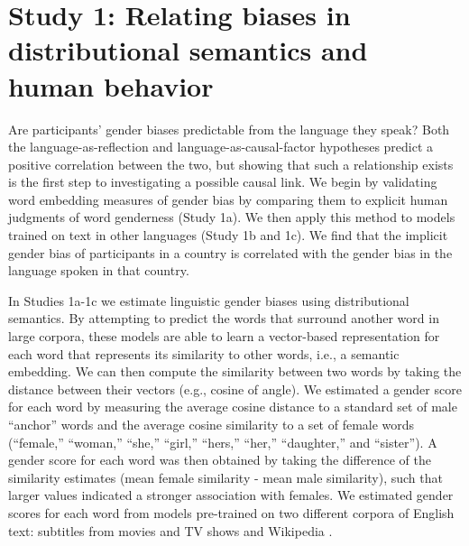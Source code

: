 \documentclass[9pt,twocolumn,twoside,lineno]{pnas-new}
\begin{document}
\section*{Study 1: Relating biases in distributional semantics and
human
behavior}\label{study-1-relating-gender-biases-in-distributional-semantics-and-human-behavior}

Are participants' gender biases predictable from the language they
speak? Both the language-as-reflection and language-as-causal-factor
hypotheses predict a positive correlation between the two, but showing
that such a relationship exists is the first step to investigating a
possible causal link. We begin by validating word embedding measures of
gender bias by comparing them to explicit human judgments of word
genderness (Study 1a). We then apply this method to models trained on
text in other languages (Study 1b and 1c). We find that the implicit gender
bias of participants in a country is correlated with the gender bias in
the language spoken in that country.


In Studies 1a-1c we estimate linguistic gender biases using distributional semantics. By attempting to predict the words that surround another word in large corpora, these models   \citep[e.g.,][]{mikolov2013efficient} are able to learn a vector-based representation for each word that represents its similarity to other words, i.e., a semantic embedding. We can then compute the similarity between two words by taking the distance between their vectors (e.g., cosine of angle). 
We estimated a gender score for each word by measuring the average cosine distance to a standard set of
male \enquote{anchor} words \citep[\enquote{male,} \enquote{man,}
\enquote{he,} \enquote{boy,} \enquote{his,} \enquote{him,}
\enquote{son,} and \enquote{brother};][]{nosek2002harvesting}
and the average cosine similarity to a set of female words
(\enquote{female,} \enquote{woman,} \enquote{she,} \enquote{girl,}
\enquote{hers,} \enquote{her,} \enquote{daughter,} and
\enquote{sister}). A gender score for each word was then obtained by
taking the difference of the similarity estimates (mean female similarity
- mean male similarity), such that larger values indicated a stronger
association with females. We estimated  gender scores for each word from
models pre-trained on two different corpora of English text: subtitles from movies
and TV shows \cite{vanparidon,lison} and Wikipedia
\cite{bojanowski2016enriching}.
\end{document}
